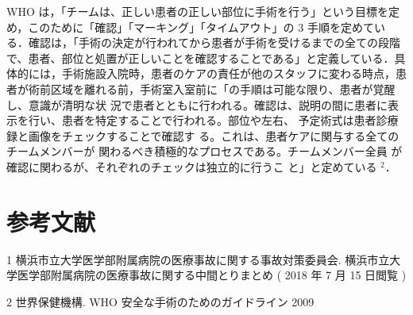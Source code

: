 \documentclass[11pt,dvipdfmx,uplatex]{jsarticle}
\begin{document}
WHO は，「チームは、正しい患者の正しい部位に手術を行う」という目標を定め，このために「確認」「マーキング」「タイムアウト」の 3 手順を定めている．確認は，「手術の決定が行われてから患者が手術を受けるまでの全ての段階で、患者、部位と処置が正しいことを確認することである」と定義している．具体的には，手術施設入院時，患者のケアの責任が他のスタッフに変わる時点，患者が術前区域を離れる前，手術室入室前に「の手順は可能な限り、患者が覚醒し、意識が清明な状
況で患者とともに行われる。確認は、説明の間に患者に表
示を行い、患者を特定することで行われる。部位や左右、
予定術式は患者診療録と画像をチェックすることで確認す
る。これは、患者ケアに関与する全てのチームメンバーが
関わるべき積極的なプロセスである。チームメンバー全員
が確認に関わるが、それぞれのチェックは独立的に行うこ
と」と定めている $^2$．


\section*{参考文献}

1 横浜市立大学医学部附属病院の医療事故に関する事故対策委員会.  横浜市立大学医学部附属病院の医療事故に関する中間とりまとめ ( 2018 年 7 月 15 日閲覧 )

2 世界保健機構. WHO 安全な手術のためのガイドライン 2009
\end{document}
